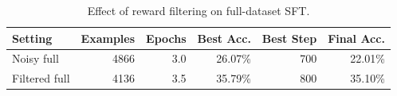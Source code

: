 \begin{table}[h]
\centering
\begin{tabular}{lrrrrr}
\toprule
Setting & Examples & Epochs & Best Acc. & Best Step & Final Acc. \\
\midrule
Noisy full & 4866 & 3.0 & 26.07\% & 700 & 22.01\% \\
Filtered full & 4136 & 3.5 & 35.79\% & 800 & 35.10\% \\
\bottomrule
\end{tabular}
\caption{Effect of reward filtering on full-dataset SFT.}
\label{tab:sft-filtered}
\end{table}
